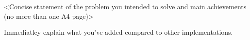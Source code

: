 <Concise statement of the problem you intended to solve and main achievements (no more than one A4 page)>

Immediatley explain what you've added compared to other implementations.